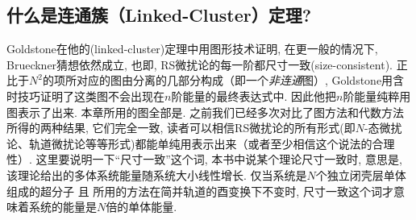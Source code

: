 \subsection{什么是连通簇（Linked-Cluster）定理?}
Goldstone在他的(linked-cluster)定理中用图形技术证明,
在更一般的情况下, Brueckner猜想依然成立,
也即, RS微扰论的每一阶都尺寸一致(size-consistent).
正比于$N^2$的项所对应的图由分离的几部分构成（即一个\emph{非连通}图）,  
Goldstone用含时技巧证明了这类图不会出现在$n$阶能量的最终表达式中. 
因此他把$n$阶能量纯粹用图表示了出来. 本章所用的图全部是. 
之前我们已经多次对比了图方法和代数方法所得的两种结果, 它们完全一致, 
读者可以相信RS微扰论的所有形式(即$N$-态微扰论、轨道微扰论等等形式)都能单纯用表示出来（或者至少相信这个说法的合理性）. 
这里要说明一下``尺寸一致''这个词,
本书中说某个理论尺寸一致时, 意思是,
该理论给出的多体系统能量随系统大小线性增长.
仅当系统是$N$个独立闭壳层单体组成的超分子 且 所用的方法在简并轨道的酉变换下不变时,
尺寸一致这个词才意味着系统的能量是$N$倍的单体能量.
